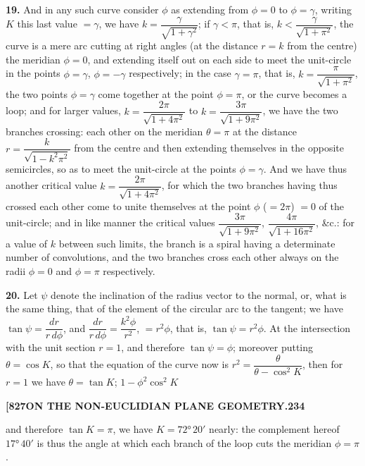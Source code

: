 \documentclass[11pt,a4paper]{book}
\begin{document}
\noindent\textbf{19.} And in any such curve consider $\phi$ as extending from $\phi = 0$ to $\phi = \gamma$, writing $K$ this last value $= \gamma$, we have $k = \dfrac{\gamma}{\sqrt{1 + \gamma^2}}$; if $\gamma < \pi$, that is, $k < \dfrac{\gamma}{\sqrt{1 + \pi^2}}$, the curve is a mere arc cutting at right angles (at the distance $r = k$ from the centre) the meridian $\phi = 0$, and extending itself out on each side to meet the unit-circle in the points $\phi = \gamma$, $\phi = -\gamma$ respectively; in the case $\gamma = \pi$, that is, $k = \dfrac{\pi}{\sqrt{1 + \pi^2}}$, the two points $\phi = \gamma$ come together at the point $\phi = \pi$, or the curve becomes a loop; and for larger values, $k = \dfrac{2\pi}{\sqrt{1 + 4\pi^2}}$ to $k = \dfrac{3\pi}{\sqrt{1 + 9\pi^2}}$, we have the two branches crossing: each other on the meridian $\theta = \pi$ at the distance $r = \dfrac{k}{\sqrt{1 - k^2\pi^2}}$ from the centre and then extending themselves in the opposite semicircles, so as to meet the unit-circle at the points $\phi = \gamma$. And we have thus another critical value $k = \dfrac{2\pi}{\sqrt{1 + 4\pi^2}}$, for which the two branches having thus crossed each other come to unite themselves at the point $\phi$ ($= 2\pi$) $= 0$ of the unit-circle; and in like manner the critical values $\dfrac{3\pi}{\sqrt{1 + 9\pi^2}}$, $\dfrac{4\pi}{\sqrt{1 + 16\pi^2}}$, \&c.: for a value of $k$ between such limits, the branch is a spiral having a determinate number of convolutions, and the two branches cross each other always on the radii $\phi = 0$ and $\phi = \pi$ respectively.

\noindent\textbf{20.} Let $\psi$ denote the inclination of the radius vector to the normal, or, what is the same thing, that of the element of the circular arc to the tangent; we have $\tan\psi = \dfrac{dr}{r\,d\phi}$, and $\dfrac{dr}{r\,d\phi} = \dfrac{k^2\phi}{r^2}$, $= r^2\phi$, that is, $\tan\psi = r^2\phi$. At the intersection with the unit section $r = 1$, and therefore $\tan\psi = \phi$; moreover putting $\theta = \cos K$, so that the equation of the curve now is $r^2 = \dfrac{\theta}{\theta - \cos^2 K}$, then for $r = 1$ we have $\theta = \tan K$; $1 - \phi^2\cos^2 K$

\newpage
\setcounter{page}{234}

\noindent\textbf{[827}\hfill\textbf{ON THE NON-EUCLIDIAN PLANE GEOMETRY.}\hfill\textbf{234}

\bigskip

\noindent and therefore $\tan K = \pi$, we have $K = 72°\,20'$ nearly: the complement hereof $17°\,40'$ is thus the angle at which each branch of the loop cuts the meridian $\phi = \pi$.
\end{document}

